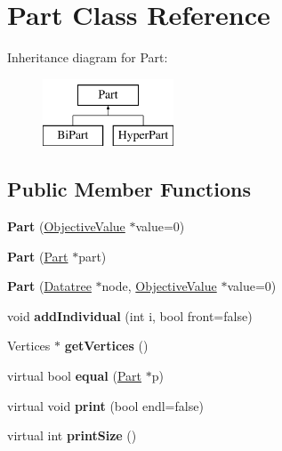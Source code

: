 \hypertarget{classPart}{\section{Part Class Reference}
\label{classPart}
}
Inheritance diagram for Part\-:\begin{figure}[H]
\begin{center}
\leavevmode
\includegraphics[height=2.000000cm]{classPart}
\end{center}
\end{figure}
\subsection*{Public Member Functions}
\begin{DoxyCompactItemize}
\item 
\hypertarget{classPart_a529e3046eef59e036be4a28293e1d696}{{\bfseries Part} (\hyperlink{classObjectiveValue}{Objective\-Value} $\ast$value=0)}\label{classPart_a529e3046eef59e036be4a28293e1d696}

\item 
\hypertarget{classPart_a4fc5eedff4d310041e3ebee54693f4ac}{{\bfseries Part} (\hyperlink{classPart}{Part} $\ast$part)}\label{classPart_a4fc5eedff4d310041e3ebee54693f4ac}

\item 
\hypertarget{classPart_abbe62c3accdcc1234035cd8149b540f0}{{\bfseries Part} (\hyperlink{classDatatree}{Datatree} $\ast$node, \hyperlink{classObjectiveValue}{Objective\-Value} $\ast$value=0)}\label{classPart_abbe62c3accdcc1234035cd8149b540f0}

\item 
\hypertarget{classPart_aa711a575b6b5bb0080b4e9fa7e20bbe1}{void {\bfseries add\-Individual} (int i, bool front=false)}\label{classPart_aa711a575b6b5bb0080b4e9fa7e20bbe1}

\item 
\hypertarget{classPart_aa5a500dd200b320ffd3a51868cc79fb0}{Vertices $\ast$ {\bfseries get\-Vertices} ()}\label{classPart_aa5a500dd200b320ffd3a51868cc79fb0}

\item 
\hypertarget{classPart_a8b37a2433f60fba0c5dcce393e4f5a86}{virtual bool {\bfseries equal} (\hyperlink{classPart}{Part} $\ast$p)}\label{classPart_a8b37a2433f60fba0c5dcce393e4f5a86}

\item 
\hypertarget{classPart_a2d3c13012c781d8651b820e60d57c724}{virtual void {\bfseries print} (bool endl=false)}\label{classPart_a2d3c13012c781d8651b820e60d57c724}

\item 
\hypertarget{classPart_a501f9fdbc4efd9ce00e1eef4a07f033e}{virtual int {\bfseries print\-Size} ()}\label{classPart_a501f9fdbc4efd9ce00e1eef4a07f033e}

\end{DoxyCompactItemize}
